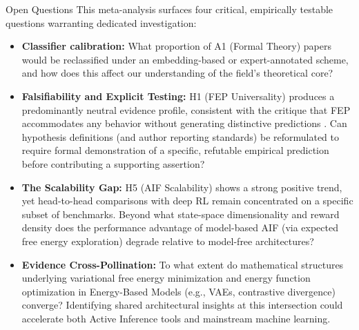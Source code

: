 \documentclass[
  ignorenonframetext,
]{beamer}
\providecommand{\tightlist}{%
  \setlength{\itemsep}{0pt}\setlength{\parskip}{0pt}}
\begin{document}
\begin{frame}{Open Questions}
\protect{}\label{open-questions}
This meta-analysis surfaces four critical, empirically testable
questions warranting dedicated investigation:

\begin{itemize}
\tightlist
\item
  \textbf{Classifier calibration:} What proportion of A1 (Formal Theory)
  papers would be reclassified under an embedding-based or
  expert-annotated scheme, and how does this affect our understanding of
  the field's theoretical core?
\item
  \textbf{Falsifiability and Explicit Testing:} H1 (FEP Universality)
  produces a predominantly neutral evidence profile, consistent with the
  critique that FEP accommodates any behavior without generating
  distinctive predictions \citep{colombo2021free}. Can hypothesis
  definitions (and author reporting standards) be reformulated to
  require formal demonstration of a specific, refutable empirical
  prediction before contributing a supporting assertion?
\item
  \textbf{The Scalability Gap:} H5 (AIF Scalability) shows a strong
  positive trend, yet head-to-head comparisons with deep RL remain
  concentrated on a specific subset of benchmarks. Beyond what
  state-space dimensionality and reward density does the performance
  advantage of model-based AIF (via expected free energy exploration)
  degrade relative to model-free architectures?
\item
  \textbf{Evidence Cross-Pollination:} To what extent do mathematical
  structures underlying variational free energy minimization and energy
  function optimization in Energy-Based Models (e.g., VAEs, contrastive
  divergence) converge? Identifying shared architectural insights at
  this intersection could accelerate both Active Inference tools and
  mainstream machine learning.
\end{itemize}
\end{frame}
\end{document}
